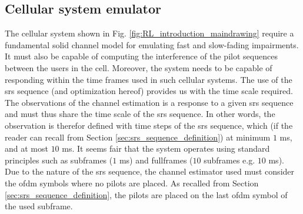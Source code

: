 \subsection{Cellular system emulator}
The cellular system shown in Fig. \ref{fig:RL_introduction_maindrawing} require a fundamental solid channel model for emulating fast and slow-fading impairments. It must also be capable of computing the interference of the pilot sequences between the users in the cell. Moreover, the system needs to be capable of responding within the time frames used in such cellular systems. The use of the \gls{srs} sequence (and optimization hereof) provides us with the time scale required. The observations of the channel estimation is a response to a given \gls{srs} sequence and must thus share the time scale of the \gls{srs} sequence. In other words, the observation is therefor defined with time steps of the \gls{srs} sequence, which (if the reader can recall from Section \ref{sec:srs_sequence_definition}) at minimum $1$ ms, and at most $10$ ms. It seems fair that the system operates using standard principles such as subframes ($1$ ms) and fullframes ($10$ subframes e.g. $10$ ms). Due to the nature of the \gls{srs} sequence, the channel estimator used must consider the \gls{ofdm} symbols where no pilots are placed. As recalled from Section \ref{sec:srs_sequence_definition}, the pilots are placed on the last \gls{ofdm} symbol of the used subframe. 


